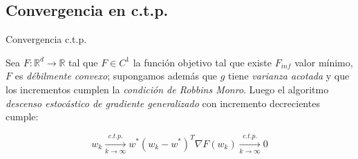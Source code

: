 \documentclass{beamer}
\newcommand{\R}{{\mathbb{R}}}
\begin{document}
\subsection{Convergencia en c.t.p.}

\begin{frame}{Convergencia c.t.p.}
\begin{theorem}
	Sea $F: \R^d \rightarrow \R$ tal que $F \in C^1$ la funci\'on objetivo tal que existe $F_{inf}$ valor m\'inimo, $F$ es \textit{d\'ebilmente convexo}; supongamos adem\'as que $g$ tiene \textit{varianza acotada} y que los incrementos cumplen la \textit{condici\'on de Robbins Monro}. Luego el algoritmo \textit{descenso estoc\'astico de gradiente generalizado} con incremento decrecientes cumple:
	
	\begin{subequations}
		\begin{equation*}
		w_k \xrightarrow[k \rightarrow \infty]{c.t.p.} w^*
		\end{equation*}
		\begin{equation*}
		\left(w_k - w^*\right)^T \nabla F(w_k) \xrightarrow[k \rightarrow \infty]{c.t.p.}  0
		\end{equation*}
	\end{subequations}
	
\end{theorem}
\end{frame}
\end{document}
